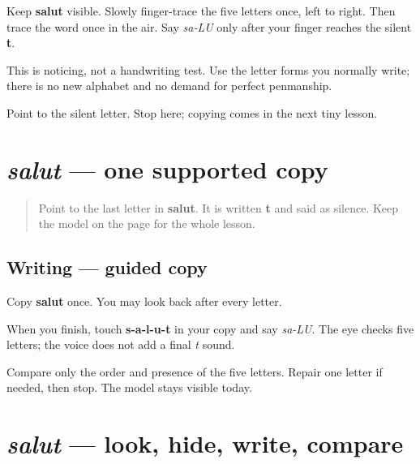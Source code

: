 Keep \textbf{salut} visible. Slowly finger-trace the five letters once, left to right. Then trace the word once in the air. Say \emph{sa-LU} only after your finger reaches the silent \textbf{t}.

This is noticing, not a handwriting test. Use the letter forms you normally write; there is no new alphabet and no demand for perfect penmanship.

\begin{tcolorbox}[breakable,colback=teal!4,colframe=teal!35!black,title={Before you move on}]
Point to the silent letter. Stop here; copying comes in the next tiny lesson.
\end{tcolorbox}
\section[salut]{\emph{salut} — one supported copy}

\label{lesson:FR-W01-salut-guided-copy}



\begin{quote}
Point to the last letter in \textbf{salut}. It is written \textbf{t} and said as silence. Keep the model on the page for the whole lesson.
\end{quote}

\subsection*{Writing — guided copy}

Copy \textbf{salut} once. You may look back after every letter.

When you finish, touch \textbf{s-a-l-u-t} in your copy and say \emph{sa-LU}. The eye checks five letters; the voice does not add a final \emph{t} sound.

\begin{tcolorbox}[breakable,colback=teal!4,colframe=teal!35!black,title={Before you move on}]
Compare only the order and presence of the five letters. Repair one letter if needed, then stop. The model stays visible today.
\end{tcolorbox}
\section[salut]{\emph{salut} — look, hide, write, compare}

